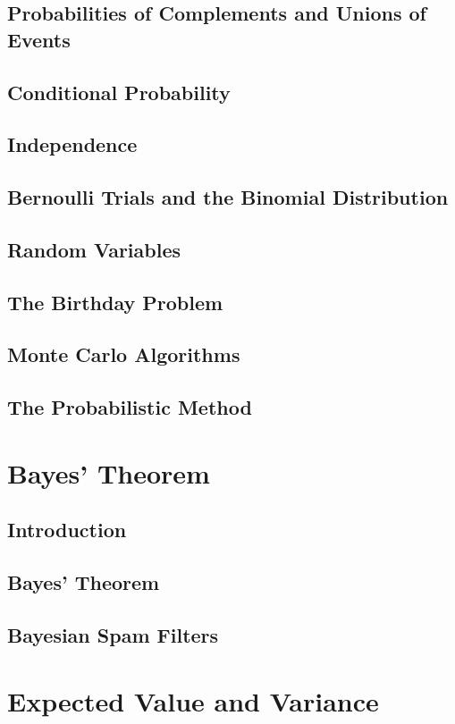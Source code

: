 \documentclass[11pt]{book}
\begin{document}
  \subsection{Probabilities of Complements and Unions of Events}
  \subsection{Conditional Probability}
  \subsection{Independence}
  \subsection{Bernoulli Trials and the Binomial Distribution}
  \subsection{Random Variables}
  \subsection{The Birthday Problem}
  \subsection{Monte Carlo Algorithms}
  \subsection{The Probabilistic Method}
  
 \section{Bayes' Theorem}
  \subsection{Introduction}
  \subsection{Bayes' Theorem}
  \subsection{Bayesian Spam Filters}
  
 \section{Expected Value and Variance}
\end{document}
